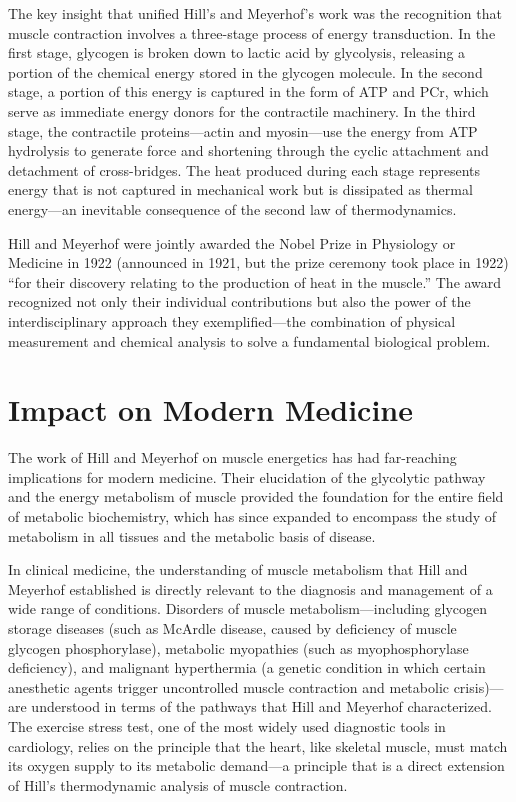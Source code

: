 The key insight that unified Hill's and Meyerhof's work was the recognition that muscle contraction involves a three-stage process of energy transduction. In the first stage, glycogen is broken down to lactic acid by glycolysis, releasing a portion of the chemical energy stored in the glycogen molecule. In the second stage, a portion of this energy is captured in the form of ATP and PCr, which serve as immediate energy donors for the contractile machinery. In the third stage, the contractile proteins---actin and myosin---use the energy from ATP hydrolysis to generate force and shortening through the cyclic attachment and detachment of cross-bridges. The heat produced during each stage represents energy that is not captured in mechanical work but is dissipated as thermal energy---an inevitable consequence of the second law of thermodynamics.

Hill and Meyerhof were jointly awarded the Nobel Prize in Physiology or Medicine in 1922 (announced in 1921, but the prize ceremony took place in 1922) ``for their discovery relating to the production of heat in the muscle.'' The award recognized not only their individual contributions but also the power of the interdisciplinary approach they exemplified---the combination of physical measurement and chemical analysis to solve a fundamental biological problem.

\section{Impact on Modern Medicine}

The work of Hill and Meyerhof on muscle energetics has had far-reaching implications for modern medicine. Their elucidation of the glycolytic pathway and the energy metabolism of muscle provided the foundation for the entire field of metabolic biochemistry, which has since expanded to encompass the study of metabolism in all tissues and the metabolic basis of disease.

In clinical medicine, the understanding of muscle metabolism that Hill and Meyerhof established is directly relevant to the diagnosis and management of a wide range of conditions. Disorders of muscle metabolism---including glycogen storage diseases (such as McArdle disease, caused by deficiency of muscle glycogen phosphorylase), metabolic myopathies (such as myophosphorylase deficiency), and malignant hyperthermia (a genetic condition in which certain anesthetic agents trigger uncontrolled muscle contraction and metabolic crisis)---are understood in terms of the pathways that Hill and Meyerhof characterized. The exercise stress test, one of the most widely used diagnostic tools in cardiology, relies on the principle that the heart, like skeletal muscle, must match its oxygen supply to its metabolic demand---a principle that is a direct extension of Hill's thermodynamic analysis of muscle contraction.

